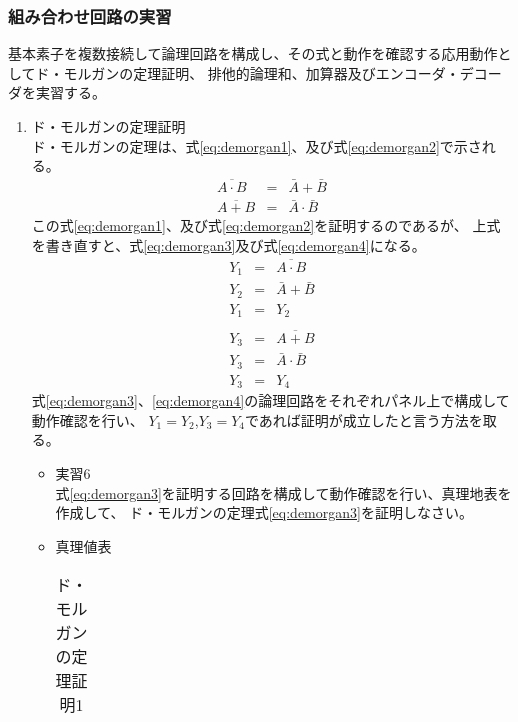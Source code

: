 \documentclass[dvipdfmx]{jsarticle}
\begin{document}
				\subsubsection{組み合わせ回路の実習}
					基本素子を複数接続して論理回路を構成し、その式と動作を確認する応用動作としてド・モルガンの定理証明、
					排他的論理和、加算器及びエンコーダ・デコーダを実習する。
					\begin{enumerate}
						\item ド・モルガンの定理証明 \\
							ド・モルガンの定理は、式\ref{eq:demorgan1}、及び式\ref{eq:demorgan2}で示される。
							\begin{eqnarray}
								\label{eq:demorgan1}
								\overline{A \cdot B} &=& \bar{A} + \bar{B} \\
								\label{eq:demorgan2}
								\overline{A + B} &=& \bar{A} \cdot \bar{B}
							\end{eqnarray}
							この式\ref{eq:demorgan1}、及び式\ref{eq:demorgan2}を証明するのであるが、
							上式を書き直すと、式\ref{eq:demorgan3}及び式\ref{eq:demorgan4}になる。
							\begin{eqnarray}
								\label{eq:demorgan3}
								Y_1 &=& \overline{A \cdot B} \\
								Y_2 &=& \bar{A} + \bar{B} \\
								Y_1 &=& Y_2 \\
							\end{eqnarray}
							\begin{eqnarray}
								\label{eq:demorgan4}
								Y_3 &=& \overline{A + B} \\
								Y_3 &=& \bar{A} \cdot \bar{B} \\
								Y_3 &=& Y_4
							\end{eqnarray}
							式\ref{eq:demorgan3}、\ref{eq:demorgan4}の論理回路をそれぞれパネル上で構成して動作確認を行い、
							$Y_1=Y_2$,$Y_3=Y_4$であれば証明が成立したと言う方法を取る。
							\begin{itemize}
								\item 実習6 \\
									式\ref{eq:demorgan3}を証明する回路を構成して動作確認を行い、真理地表を作成して、
									ド・モルガンの定理式\ref{eq:demorgan3}を証明しなさい。
								\item 真理値表
									\begin{table}[H]
										\center
										\caption{ド・モルガンの定理証明1 \label{tb:demorgan1}}
										\begin{tabular}{|c|c|c|c|}

\end{tabular}
\end{table}
\end{itemize}
\end{enumerate}
\end{document}
